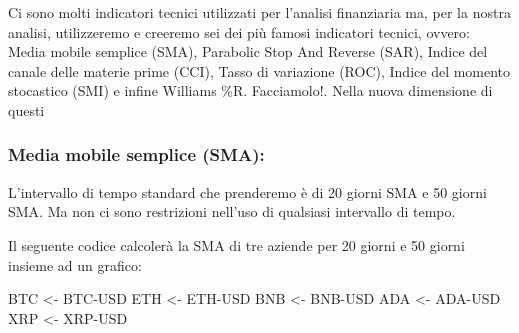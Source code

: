 \documentclass[]{tufte-handout}
\newenvironment{Shaded}{}{}
\newcommand{\AttributeTok}[1]{\textcolor[rgb]{0.49,0.56,0.16}{#1}}
\newcommand{\CommentTok}[1]{\textcolor[rgb]{0.38,0.63,0.69}{\textit{#1}}}
\newcommand{\DecValTok}[1]{\textcolor[rgb]{0.25,0.63,0.44}{#1}}
\newcommand{\FunctionTok}[1]{\textcolor[rgb]{0.02,0.16,0.49}{#1}}
\newcommand{\NormalTok}[1]{#1}
\newcommand{\OtherTok}[1]{\textcolor[rgb]{0.00,0.44,0.13}{#1}}
\newcommand{\SpecialCharTok}[1]{\textcolor[rgb]{0.25,0.44,0.63}{#1}}
\newcommand{\StringTok}[1]{\textcolor[rgb]{0.25,0.44,0.63}{#1}}
\begin{document}
Ci sono molti indicatori tecnici utilizzati per l'analisi finanziaria
ma, per la nostra analisi, utilizzeremo e creeremo sei dei più famosi
indicatori tecnici, ovvero: Media mobile semplice (SMA), Parabolic Stop
And Reverse (SAR), Indice del canale delle materie prime (CCI), Tasso di
variazione (ROC), Indice del momento stocastico (SMI) e infine Williams
\%R. Facciamolo!. Nella nuova dimensione di questi

\hypertarget{media-mobile-semplice-sma}{%
\subsubsection{Media mobile semplice
(SMA):}\label{media-mobile-semplice-sma}}

L'intervallo di tempo standard che prenderemo è di 20 giorni SMA e 50
giorni SMA. Ma non ci sono restrizioni nell'uso di qualsiasi intervallo
di tempo.

Il seguente codice calcolerà la SMA di tre aziende per 20 giorni e 50
giorni insieme ad un grafico:

\begin{Shaded}
\begin{Highlighting}[]
\NormalTok{BTC }\OtherTok{\textless{}{-}} \StringTok{\textasciigrave{}}\AttributeTok{BTC{-}USD}\StringTok{\textasciigrave{}}
\NormalTok{ETH }\OtherTok{\textless{}{-}} \StringTok{\textasciigrave{}}\AttributeTok{ETH{-}USD}\StringTok{\textasciigrave{}}
\NormalTok{BNB }\OtherTok{\textless{}{-}} \StringTok{\textasciigrave{}}\AttributeTok{BNB{-}USD}\StringTok{\textasciigrave{}}
\NormalTok{ADA }\OtherTok{\textless{}{-}} \StringTok{\textasciigrave{}}\AttributeTok{ADA{-}USD}\StringTok{\textasciigrave{}}
\NormalTok{XRP }\OtherTok{\textless{}{-}} \StringTok{\textasciigrave{}}\AttributeTok{XRP{-}USD}\StringTok{\textasciigrave{}}
\end{Highlighting}
\end{Shaded}

\begin{Shaded}
\end{Shaded}
\end{document}
